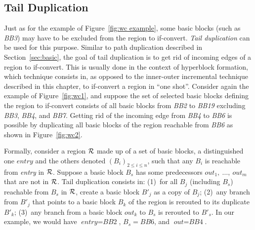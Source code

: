 \subsection{Tail Duplication}

Just as for the example of Figure~\ref{fig:wc example}, some basic blocks (such as \textit{BB3}) may have to be excluded from the region to if-convert. 
\emph{Tail duplication}  can be used for this purpose. 
Similar to path duplication described in Section~\ref{sec:basic}, the goal of tail duplication is to get rid of incoming edges of a region to if-convert. 
This is usually done in the context of hyperblock formation, which technique consists in, as opposed to the inner-outer incremental technique described in this chapter, to if-convert a region in ``one shot''. 
Consider again the example of Figure~\ref{fig:wc1}, and suppose the set of selected basic blocks defining the region to if-convert consists of all basic blocks from \textit{BB2} to \textit{BB19} excluding \textit{BB3}, \textit{BB4}, and \textit{BB7}. 
Getting rid of the incoming edge from \textit{BB4} to \textit{BB6} is possible by duplicating all basic blocks of the region reachable from \textit{BB6} as shown in Figure~\ref{fig:wc2}.

Formally, consider a region $\cal R$ made up of a set of basic blocks, a distinguished one $\textit{entry}$ and the others denoted $\left(B_i\right)_{2\leq i\leq n}$, such that any $B_i$ is reachable from \textit{entry} in $\cal R$. 
Suppose a basic block $B_s$ has some predecessors $\textit{out}_1,\ \dots,\ \textit{out}_m$ that are not in $\cal R$. 
Tail duplication consists in: 
(1)~for all $B_j$ (including $B_s$) reachable from $B_s$ in $\cal R$, create a basic block $B'_j$ as a copy of $B_j$; 
(2)~any branch from $B'_j$ that points to a basic block $B_k$ of the region is rerouted to its duplicate $B'_k$; 
(3)~any branch from a basic block $\textit{out}_k$ to $B_s$ is rerouted to $B'_s$. 
In our example, we would have $\textit{entry}=\textit{BB2}$, $B_s=\textit{BB6}$, and $\textit{out}=\textit{BB4}$.

